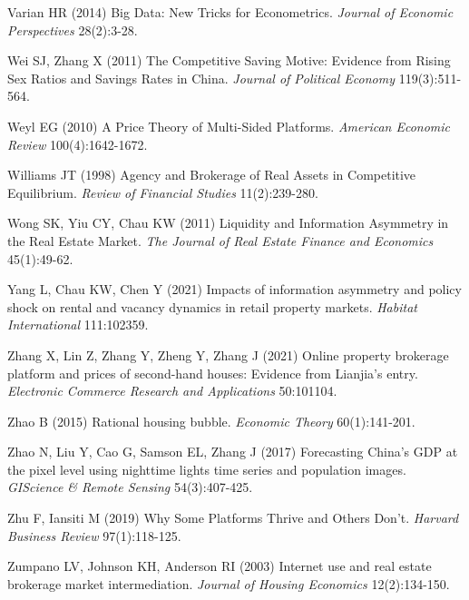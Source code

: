 \documentclass[11pt]{article}
\begin{document}
\begin{singlespace}
\begin{thebibliography}{}
Varian HR (2014) Big Data: New Tricks for Econometrics. \textit{Journal of Economic Perspectives} 28(2):3-28.

Wei SJ, Zhang X (2011) The Competitive Saving Motive: Evidence from Rising Sex Ratios and Savings Rates in China. \textit{Journal of Political Economy} 119(3):511-564. 

Weyl EG (2010) A Price Theory of Multi-Sided Platforms. \textit{American Economic Review} 100(4):1642-1672.

Williams JT (1998) Agency and Brokerage of Real Assets in Competitive Equilibrium. \textit{Review of Financial Studies} 11(2):239-280.

Wong SK, Yiu CY, Chau KW (2011) Liquidity and Information Asymmetry in the Real Estate Market. \textit{The Journal of Real Estate Finance and Economics} 45(1):49-62.

Yang L, Chau KW, Chen Y (2021) Impacts of information asymmetry and policy shock on rental and vacancy dynamics in retail property markets. \textit{Habitat International} 111:102359.

Zhang X, Lin Z, Zhang Y, Zheng Y, Zhang J (2021) Online property brokerage platform and prices of second-hand houses: Evidence from Lianjia's entry. \textit{Electronic Commerce Research and Applications} 50:101104.

Zhao B (2015) Rational housing bubble. \textit{Economic Theory} 60(1):141-201.

Zhao N, Liu Y, Cao G, Samson EL, Zhang J (2017) Forecasting China's GDP at the pixel level using nighttime lights time series and population images. \textit{GIScience \& Remote Sensing} 54(3):407-425.

Zhu F, Iansiti M (2019) Why Some Platforms Thrive and Others Don't. \textit{Harvard Business Review} 97(1):118-125.

Zumpano LV, Johnson KH, Anderson RI (2003) Internet use and real estate brokerage market intermediation. \textit{Journal of Housing Economics} 12(2):134-150.

  \end{thebibliography}
\end{singlespace}
\end{document}
